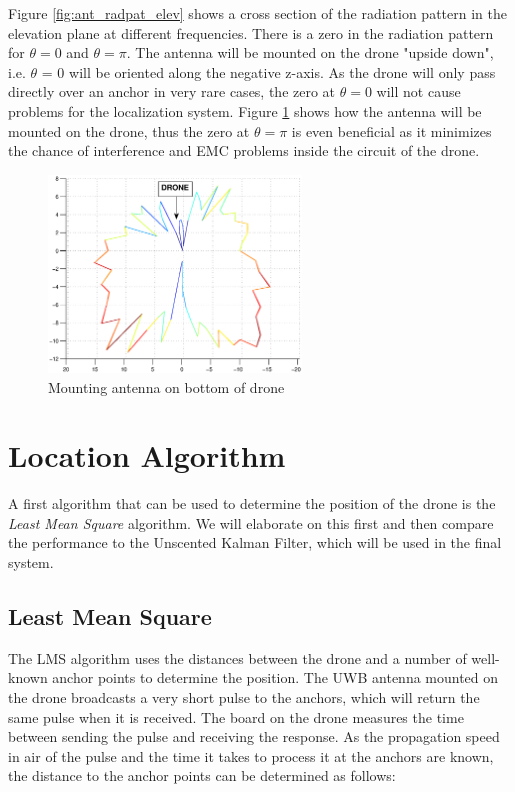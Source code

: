 \documentclass[a4paper]{article}        %
\begin{document}
			Figure \ref{fig:ant_radpat_elev} shows a cross section of the radiation pattern in the elevation plane at different frequencies. There is a zero in the radiation pattern for $\theta=0$ and $\theta=\pi$. The antenna will be mounted on the drone "upside down", i.e. $\theta$ = 0 will be oriented along the negative z-axis. As the drone will only pass directly over an anchor in very rare cases, the zero at $\theta=0$ will not cause problems for the localization system. Figure \ref{fig:mount_antenna} shows how the antenna will be mounted on the drone, thus the zero at $\theta=\pi$ is even beneficial as it minimizes the chance of interference and EMC problems inside the circuit of the drone. 

		\begin{figure}[H]
			\centering
			\includegraphics[width=0.6\textwidth]{images/antenna/mount_antenna}
			\caption{Mounting antenna on bottom of drone}
			\label{fig:mount_antenna}
		\end{figure}

\section{Location Algorithm}
	A first algorithm that can be used to determine the position of the drone is the \textit{Least Mean Square} algorithm. We will elaborate on this first and then compare the performance to the Unscented Kalman Filter, which will be used in the final system. 

	\subsection{Least Mean Square}
	\label{subsec:LMS}

		The LMS algorithm uses the distances between the drone and a number of well-known anchor points to determine the position. The UWB antenna mounted on the drone broadcasts a very short pulse to the anchors, which will return the same pulse when it is received. The board on the drone measures the time between sending the pulse and receiving the response. As the propagation speed in air of the pulse and the time it takes to process it at the anchors are known, the distance to the anchor points can be determined as follows:
\end{document}
